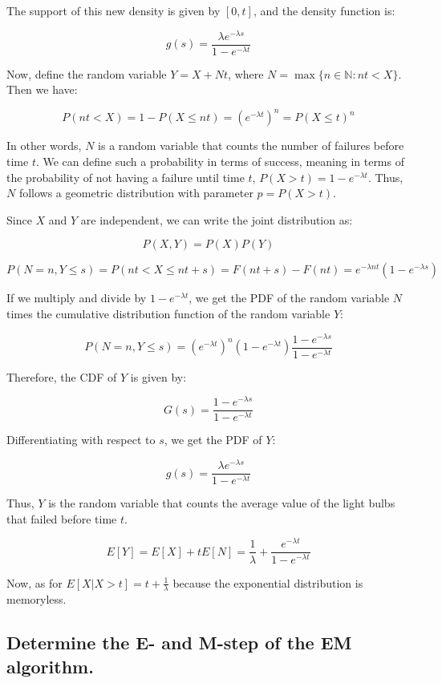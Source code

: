 \documentclass[
]{article}
\begin{document}
The support of this new density is given by \([0, t]\), and the density
function is:

\[
g(s) = \frac{\lambda e^{-\lambda s}}{1 - e^{-\lambda t}}
\]

Now, define the random variable \(Y = X + Nt\), where
\(N = \max\{n \in \mathbb{N} : nt < X\}\). Then we have:

\[
P(nt < X) = 1 - P(X \leq nt) = (e^{-\lambda t})^n = P(X \leq t)^n
\]

In other words, \(N\) is a random variable that counts the number of
failures before time \(t\). We can define such a probability in terms of
success, meaning in terms of the probability of not having a failure
until time \(t\), \(P(X > t) = 1 - e^{-\lambda t}\). Thus, \(N\) follows
a geometric distribution with parameter \(p = P(X > t)\).

Since \(X\) and \(Y\) are independent, we can write the joint
distribution as:

\[
P(X, Y) = P(X)P(Y)
\]

\[
P(N = n, Y \leq s) = P(nt < X \leq nt + s) = F(nt + s) - F(nt) = e^{-\lambda nt}(1 - e^{-\lambda s})
\]

If we multiply and divide by \(1 - e^{-\lambda t}\), we get the PDF of
the random variable \(N\) times the cumulative distribution function of
the random variable \(Y\):

\[
P(N = n, Y \leq s) = (e^{-\lambda t})^n (1 - e^{-\lambda t}) \frac{1 - e^{-\lambda s}}{1 - e^{-\lambda t}}
\]

Therefore, the CDF of \(Y\) is given by:

\[
G(s) = \frac{1 - e^{-\lambda s}}{1 - e^{-\lambda t}}
\]

Differentiating with respect to \(s\), we get the PDF of \(Y\):

\[
g(s) = \frac{\lambda e^{-\lambda s}}{1 - e^{-\lambda t}}
\]

Thus, \(Y\) is the random variable that counts the average value of the
light bulbs that failed before time \(t\).

\[
E[Y] = E[X] + tE[N] = \frac{1}{\lambda} + \frac{e^{-\lambda t}}{1 - e^{-\lambda t}}
\]

Now, as for \(E[X| X > t] = t + \frac{1}{\lambda}\) because the
exponential distribution is memoryless.

\subsection{Determine the E- and M-step of the EM
algorithm.}\label{determine-the-e--and-m-step-of-the-em-algorithm.}
\end{document}

